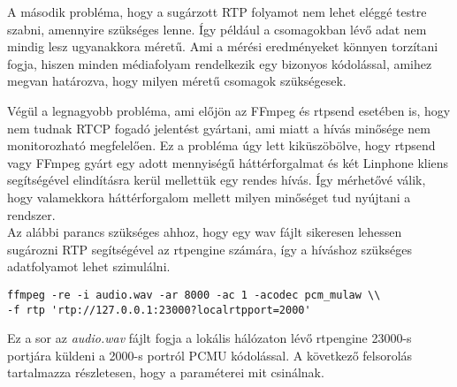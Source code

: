 A második probléma, hogy a sugárzott RTP folyamot nem lehet eléggé testre szabni, 
amennyire szükséges lenne. Így például a csomagokban lévő adat nem mindig lesz 
ugyanakkora méretű. Ami a mérési eredményeket könnyen torzítani fogja, hiszen 
minden médiafolyam rendelkezik egy bizonyos kódolással, amihez megvan határozva, hogy
milyen méretű csomagok szükségesek.

Végül a legnagyobb probléma, ami előjön az FFmpeg és rtpsend esetében is, hogy nem
tudnak RTCP fogadó jelentést gyártani, ami miatt a hívás minősége nem monitorozható 
megfelelően. Ez a probléma úgy lett kiküszöbölve, hogy rtpsend vagy FFmpeg gyárt
egy adott mennyiségű háttérforgalmat és két Linphone kliens segítségével elindításra 
kerül mellettük egy rendes hívás. Így mérhetővé válik, hogy valamekkora háttérforgalom
mellett milyen minőséget tud nyújtani a rendszer. \\

Az alábbi parancs szükséges ahhoz, hogy egy wav fájlt sikeresen lehessen sugározni
RTP segítségével az rtpengine számára, így a híváshoz szükséges adatfolyamot lehet
szimulálni. 

\begin{lstlisting}[caption=FFmpeg RTP folyam indtása, label=lst:FFmpeg]
ffmpeg -re -i audio.wav -ar 8000 -ac 1 -acodec pcm_mulaw \\
-f rtp 'rtp://127.0.0.1:23000?localrtpport=2000'
\end{lstlisting}

Ez a sor az \textit{audio.wav} fájlt fogja a lokális hálózaton lévő rtpengine 23000-s
portjára küldeni a 2000-s portról PCMU kódolással. A következő felsorolás 
tartalmazza részletesen, hogy a paraméterei mit csinálnak.

